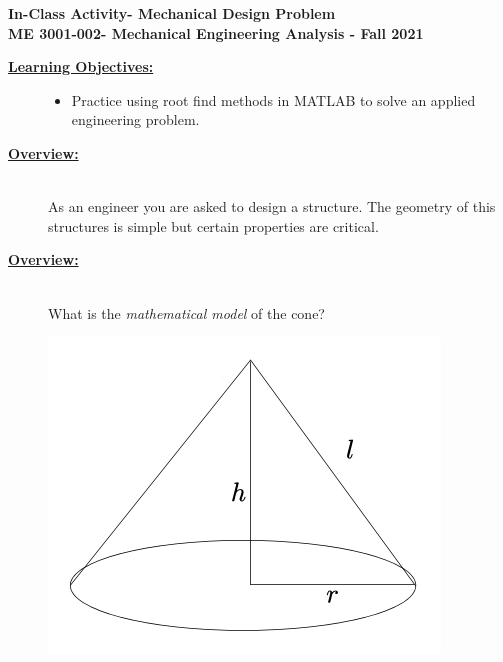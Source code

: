 \documentclass[12pt]{article}
\newcommand{\COURNAME}{ME 3001-002}
\newcommand{\CURRTERM}{Fall 2021} %
\newcommand{\ANUM}{3} %
\newcommand{\activitytitle}{Mechanical Design Problem} %
\begin{document}
\thispagestyle{plain}

\begin{center}
   {\bf \Large In-Class Activity\hspc\ANUM\hspc - \activitytitle}\vspace{3mm}\\
   {\bf \large \COURNAME - Mechanical Engineering Analysis - \CURRTERM} \vspace{5mm}\\
\end{center}

\begin{description}


\item[\textbf{\underline{Learning Objectives:}}] \hfill \vspace{0mm}

\begin{itemize}
	\item Practice using root find methods in MATLAB to solve an applied engineering problem.
\end{itemize}


\item[\textbf{\underline{Overview:}}] \hfill \vspace{3mm}\\

As an engineer you are asked to design a structure. The geometry of this structures is simple but certain properties are critical. 

\item[\textbf{\underline{Overview:}}] \hfill \vspace{3mm}\\
	
	What is the {\it mathematical model} of the cone?  
	
	\includegraphics[scale=.35]{lecture3_fig1.png}\\
	 \\
	 \\
	

\end{description}
\end{document}
